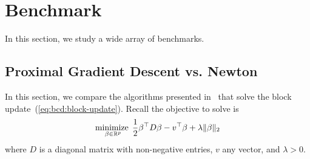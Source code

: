 \section{Benchmark}\label{sec:benchmark}

In this section, we study a wide array of benchmarks.

\subsection{Proximal Gradient Descent vs. Newton}\label{ssec:benchmark:pgd-newton}

In this section, we compare the algorithms presented 
in~
that solve the block update~(\ref{eq:bcd:block-update}).
Recall the objective to solve is
\begin{align*}
    \operatorname*{minimize\;}_{\beta \in \mathbb{R}^p}
    \frac{1}{2} \beta^\top D \beta
    - v^\top \beta
    + \lambda \|\beta\|_2
\end{align*}
where $D$ is a diagonal matrix with non-negative entries,
$v$ any vector, and $\lambda > 0$.

